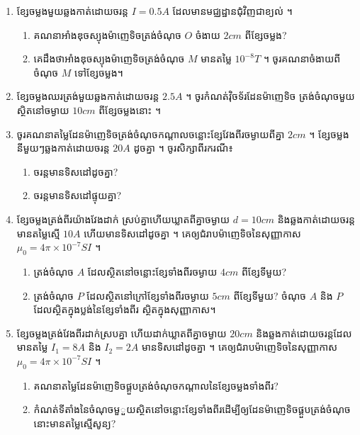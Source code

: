 \documentclass[12pt, a4paper]{article}
\begin{document}
\maketitle
\begin{enumerate}[m]
	\item ខ្សែចម្លងមួយឆ្លងកាត់ដោយចរន្ត $I=0.5A$ ដែលមានមជ្ឈដ្ឋានជុំវិញជាខ្យល់ ។
	\begin{enumerate}[k]
		\item គណនាអាំងឌុចស្យុងម៉ាញេទិចត្រង់ចំណុច $O$ ចំងាយ $2cm$ ពីខ្សែចម្លង?
		\item គេដឹងថាអាំងឌុចស្យុងម៉ាញេទិចត្រង់ចំណុច $M$ មានតម្លៃ $10^{-8} T$ ។ ចូរគណនាចំងាយពីចំណុច $M$ ទៅខ្សែចម្លង។ 
	\end{enumerate} 
	\item ខ្សែចម្លងឈរត្រង់មួយឆ្លងកាត់ដោយចរន្ត $2.5A$ ។ ចូរកំណត់វ៉ិចទ័រដែនម៉ាញេទិច ត្រង់ចំណុចមួយស្ថិតនៅចម្ងាយ $10cm$ ពីខ្សែចម្លងនោះ ។
	\item ចូរគណនាតម្លៃដែនម៉ាញេទិចត្រង់ចំណុចកណ្តាលចន្លោះខ្សែវែងពីរចម្ងាយពីគ្នា $2cm$ ។ ខ្សែចម្លងនីមួយៗឆ្លងកាត់ដោយចរន្ត $20A$ ដូចគ្នា ។ ចូរសិក្សាពីរករណី៖
	\begin{enumerate}[k,2]
		\item ចរន្តមានទិសដៅដូចគ្នា?
		\item ចរន្តមានទិសដៅផ្ទុយគ្នា?
	\end{enumerate}
	\item ខ្សែចម្លងត្រង់ពីរយ៉ាងវែងដាក់ ស្រប់គ្នាហើយឃ្លាតពីគ្នាចម្ងាយ $d=10cm$ និងឆ្លងកាត់ដោយចរន្តមានតម្លៃស្មើ $10A$ ហើយមានទិសដៅដូចគ្នា ។ គេឲ្យជំរាបម៉ាញេទិចនៃសុញ្ញាកាស $\mu_0=4\pi\times10^{-7}SI$ ។
	\begin{enumerate}[k]
		\item ត្រង់ចំណុច $A$ ដែលស្ថិតនៅចន្លោះខ្សែទាំងពីរចម្ងាយ $4cm$ ពីខ្សែទីមួយ?
		\item ត្រង់ចំណុច $P$ ដែលស្ថិតនៅក្រៅខ្សែទាំងពីរចម្ងាយ $5cm$ ពីខ្សែទីមួយ? ចំណុច $A$ និង $P$ ដែលស្ថិតក្នុងប្លង់នៃខ្សែទាំងពីរ ស្ថិតក្នុងសុញ្ញាកាស។
	\end{enumerate}
	\item ខ្សែចម្លងត្រង់វែងពីរដាក់ស្របគ្នា ហើយដាក់ឃ្លាតពីគ្នាចម្ងាយ $20cm$ និងឆ្លងកាត់ដោយចរន្តដែលមានតម្លៃ $I_1=8A$ និង $I_2=2A$ មានទិសដៅដូចគ្នា ។ គេឲ្យជំរាបម៉ាញេទិចនៃសុញ្ញាកាស $\mu_0=4\pi\times10^{-7}SI$ ។
	\begin{enumerate}[k]
		\item គណនាតម្លៃដែនម៉ាញេទិចផ្គួបត្រង់ចំណុចកណ្តាលនៃខ្សែចម្លងទាំងពីរ?
		\item កំណត់ទីតាំងនៃចំណុចមួួយស្ថិតនៅចន្លោះខ្សែទាំងពីរដើម្បីឲ្យដែនម៉ាញេទិចផ្គួបត្រង់ចំណុចនោះមានតម្លៃស្មើសូន្យ?
	\end{enumerate}

\end{enumerate}
\end{document}
